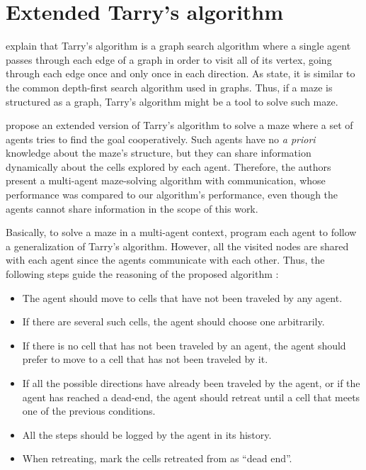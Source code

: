 \section{Extended Tarry's algorithm}
\label{section_models_tarry_algorithm}
 explain that Tarry's algorithm is a graph search algorithm where a single agent passes through each edge of a graph in order to visit all of its vertex, going through each edge once and only once in each direction. As  state, it is similar to the common depth-first search algorithm used in graphs. Thus, if a maze is structured as a graph, Tarry's algorithm might be a tool to solve such maze.

 propose an extended version of Tarry's algorithm to solve a maze where a set of agents tries to find the goal cooperatively. Such agents have no \textit{a priori} knowledge about the maze's structure, but they can share information dynamically about the cells explored by each agent. Therefore, the authors present a multi-agent maze-solving algorithm with communication, whose performance was compared to our algorithm's performance, even though the agents cannot share information in the scope of this work.

Basically, to solve a maze in a multi-agent context,  program each agent to follow a generalization of Tarry's algorithm. However, all the visited nodes are shared with each agent since the agents communicate with each other. Thus, the following steps guide the reasoning of the proposed algorithm \cite{KivelevitchCohen2010}:

\begin{itemize}
\item The agent should move to cells that have not been traveled by any agent.

\item If there are several such cells, the agent should choose one arbitrarily.

\item If there is no cell that has not been traveled by an agent, the agent should prefer to move to a cell that has not been traveled by it.

\item If all the possible directions have already been traveled by the agent, or if the agent has reached a dead-end, the agent should retreat until a cell that meets one of the previous conditions.

\item All the steps should be logged by the agent in its history.

\item When retreating, mark the cells retreated from as ``dead end''.
\end{itemize}

